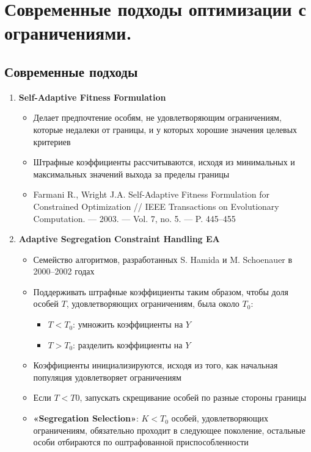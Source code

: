 \usepackage{amsmath}
\usepackage{lh}
\usepackage{graphicx}
\graphicspath{ {./images/} }


\section{Современные подходы оптимизации с ограничениями.}

\subsection{Современные подходы}
\begin{enumerate}
    \item \textbf{Self-Adaptive Fitness Formulation}
    \begin{itemize}
        \item Делает предпочтение особям, не удовлетворяющим ограничениям, которые недалеки от границы, и у которых хорошие значения целевых критериев
        \item Штрафные коэффициенты рассчитываются, исходя из минимальных и максимальных значений выхода за пределы границы
        \item Farmani R., Wright J.A. Self-Adaptive Fitness Formulation for Constrained Optimization // IEEE
        Transactions on Evolutionary Computation. — 2003. — Vol. 7, no. 5. — P. 445–455
    \end{itemize}


    \item \textbf{Adaptive Segregation Constraint Handling EA}
    \begin{itemize}
        \item Семейство алгоритмов, разработанных S. Hamida и M. Schoenauer в 2000–2002 годах
        \item Поддерживать штрафные коэффициенты таким образом, чтобы доля особей $T$, удовлетворяющих ограничениям, была около $T_0$:
        \begin{itemize}
            \item  $T < T_0$: умножить коэффициенты на $Y$
            \item  $T > T_0$: разделить коэффициенты на $Y$
        \end{itemize}
        \item Коэффициенты инициализируются, исходя из того, как начальная популяция удовлетворяет ограничениям
        \item Если $T < T0$, запускать скрещивание особей по разные стороны границы
        \item  \textbf{«Segregation Selection»}: $K < T_0$ особей, удовлетворяющих ограничениям, обязательно проходит в следующее поколение, остальные особи отбираются по оштрафованной приспособленности


\end{itemize}
\end{enumerate}
